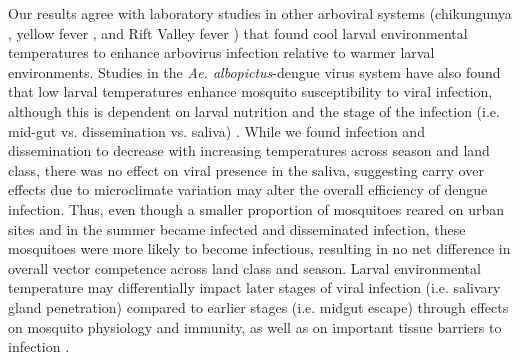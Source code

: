 \documentclass[doublespacing, linenumbers]{bmcart}
\begin{document}
Our results agree with laboratory studies in other arboviral systems (chikungunya \cite{adelman2013}, yellow fever \cite{adelman2013}, and Rift Valley fever \cite{turell1993}) that found cool larval environmental temperatures to enhance arbovirus infection relative to warmer larval environments.
Studies in the \textit{Ae. albopictus}-dengue virus system have also found that low larval temperatures enhance mosquito susceptibility to viral infection, although this is dependent on larval nutrition \cite{buckner2016} and the stage of the infection (i.e. mid-gut vs. dissemination vs. saliva) \cite{alto2013}.
While we found infection and dissemination to decrease with increasing temperatures across season and land class, there was no effect on viral presence in the saliva, suggesting carry over effects due to microclimate variation may alter the overall efficiency of dengue infection.
Thus, even though a smaller proportion of mosquitoes reared on urban sites and in the summer became infected and disseminated infection, these mosquitoes were more likely to become infectious, resulting in no net difference in overall vector competence across land class and season.
Larval environmental temperature may differentially impact later stages of viral infection (i.e. salivary gland penetration) compared to earlier stages (i.e. midgut escape) through effects on mosquito physiology and immunity, as well as on important tissue barriers to infection \cite{murdock2012,adelman2013,franz2015,houk1979}.
\end{document}
